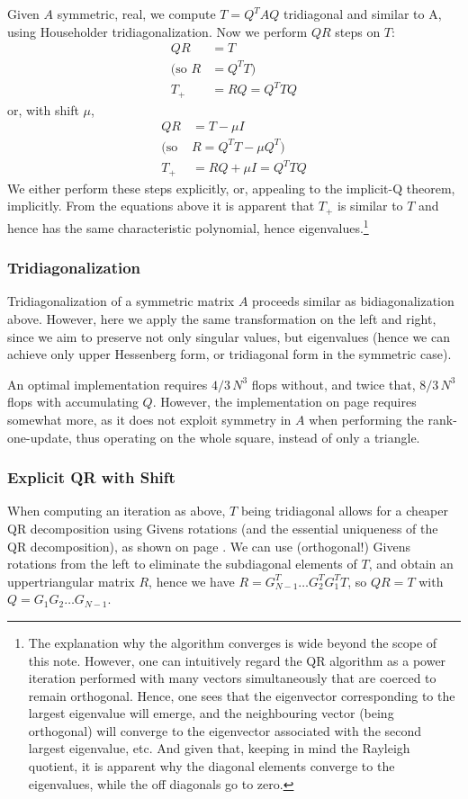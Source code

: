 \documentclass[11pt]{article}
\begin{document}
Given $A$ symmetric, real, we compute $T=Q^T AQ$ tridiagonal and similar to A, using Householder tridiagonalization. Now we perform $QR$ steps on $T$:
\begin{align*}
QR&=T  \\
(\text{so }  R &= Q^T T)\\
T_+ &= RQ = Q^T TQ
\end{align*}
or, with shift $\mu$,
\begin{align*}
QR&=T - \mu I \\ 
(\text{so }  &R  = Q^T T - \mu Q^T)\\
T_+ &= RQ + \mu I = Q^T TQ
\end{align*}
We either perform these steps explicitly, or, appealing to the implicit-Q theorem, implicitly. From the equations above it is apparent that $T_+$ is similar to $T$ and hence has the same characteristic polynomial, hence eigenvalues.\footnote{The explanation why the algorithm converges is wide beyond the scope of this note. However, one can intuitively regard the QR algorithm as a power iteration performed with many vectors simultaneously that are coerced to remain orthogonal. Hence, one sees that the eigenvector corresponding to the largest eigenvalue will emerge, and the neighbouring vector (being orthogonal) will converge to the eigenvector associated with the second largest eigenvalue, etc. And given that, keeping in mind the Rayleigh quotient, it is apparent why the diagonal elements converge to the eigenvalues, while the off diagonals go to zero.}

\subsubsection{Tridiagonalization}
Tridiagonalization of a symmetric matrix $A$ proceeds similar as bidiagonalization above. However, here we apply the same transformation on the left and right, since we aim to preserve not only singular values, but eigenvalues (hence we can achieve only upper Hessenberg form, or tridiagonal form in the symmetric case).

An optimal implementation requires $4/3\,N^3$ flops without, and twice that, $8/3\,N^3$ flops with accumulating $Q$. However, the implementation on page \pageref{rc:symtridhh} requires somewhat more, as it does not exploit symmetry in $A$ when performing the rank-one-update, thus operating on the whole square, instead of only a triangle.

\subsubsection{Explicit QR with Shift}
When computing an iteration as above, $T$ being tridiagonal allows for a cheaper QR decomposition using Givens rotations (and the essential uniqueness of the QR decomposition), as shown on page \pageref{rc:qrsymtrid}. We can use (orthogonal!) Givens rotations from the left to eliminate the subdiagonal elements of $T$, and obtain an uppertriangular matrix $R$, hence we have $R = G_{N-1}^T\ldots G_2^T G_1^T T$, so $QR=T$ with $Q=G_1 G_2\ldots G_{N-1}$. 
\end{document}

